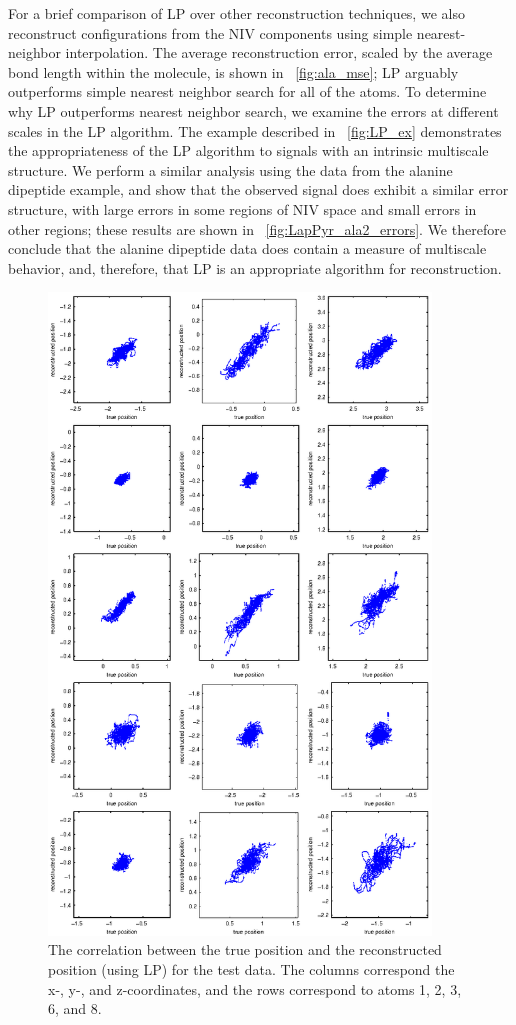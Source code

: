 For a brief comparison of LP over other reconstruction techniques, we also reconstruct configurations from the
NIV components using simple nearest-neighbor interpolation.
%
The average reconstruction error, scaled by the average bond length within the molecule, is shown in \fig~\ref{fig:ala_mse};
LP arguably outperforms simple nearest neighbor search for all of the atoms.
%
To determine why LP outperforms nearest neighbor search, we examine the errors at different scales in the LP algorithm.
%
The example described in \fig~\ref{fig:LP_ex} demonstrates the appropriateness of the LP algorithm to signals with an intrinsic multiscale structure.
%
We perform a similar analysis using the data from the alanine dipeptide example, and show that the observed signal does exhibit a similar error structure,
with large errors in some regions of NIV space and small errors in other regions;
these results are shown in \fig~\ref{fig:LapPyr_ala2_errors}.
%
We therefore conclude that the alanine dipeptide data does contain a measure of multiscale behavior, and, therefore, that LP is an appropriate algorithm for reconstruction.

\begin{figure}[t]
  \centering
        \includegraphics[width=4in]{fig9}
  \caption[Laplacian Pyramids reconstruction for alanine dipeptide data]{The correlation between the true position and the reconstructed position (using LP) for the test data. The columns correspond the x-, y-, and z-coordinates, and the rows correspond to atoms 1, 2, 3, 6, and 8.}
  \label{fig:ala_recon}
\end{figure}

